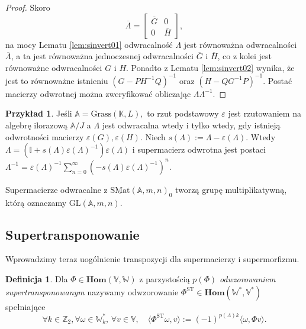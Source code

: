 \documentclass[11pt,a4paper]{report}
\theoremstyle{definition}
\newtheorem{example}[theorem]{Przykład}
\newtheorem{definition}[theorem]{Definicja}
\newcommand{\I}{\mathbb{I}}
\begin{document}
\begin{proof}
	Skoro $$\overline{\Lambda} = \begin{bmatrix}
	\overline{G} & 0 \\
	0 & \overline{H}
	\end{bmatrix},$$ na mocy Lematu \ref{lem:sinvert01} odwracalność $\Lambda$ jest równoważna odwracalności $\overline{\Lambda}$, a ta jest równoważna jednoczesnej odwracalności $\overline{G}$ i $\overline{H}$, co z kolei jest równoważne odwracalności $G$ i $H$. Ponadto z Lematu \ref{lem:sinvert02} wynika, że jest to równoważne istnieniu $(G-PH^{-1}Q)^{-1}$ oraz $(H-QG^{-1}P)^{-1}$. Postać macierzy odwrotnej można zweryfikować obliczając $\Lambda \Lambda^{-1}$.
\end{proof}

\begin{example}
	Jeśli $\mathbb{A} = \mathrm{Grass}(\mathbb{K}, L),$ to rzut podstawowy $\varepsilon$ jest rzutowaniem na algebrę ilorazową $\mathbb{A} / J$ a $\Lambda$ jest odwracalna wtedy i tylko wtedy, gdy istnieją odwrotności macierzy $\varepsilon(G), \varepsilon(H)$. Niech $s(\Lambda) := \Lambda - \varepsilon(\Lambda)$. Wtedy $\Lambda = (\I +s(\Lambda) \varepsilon(\Lambda)^{-1}) \varepsilon(\Lambda)$ i supermacierz odwrotna jest postaci $\Lambda^{-1} = \varepsilon(\Lambda)^{-1} \sum_{n=0}^{\infty} (-s(\Lambda) \varepsilon(\Lambda)^{-1})^{n}$.
\end{example}

Supermacierze odwracalne z $\underline{\mathrm{SMat}}(\mathbb{A},m,n)_0$ tworzą grupę multiplikatywną, którą oznaczamy $\mathrm{GL}(\mathbb{A},m,n).$

\subsection{Supertransponowanie}

Wprowadzimy teraz uogólnienie transpozycji dla supermacierzy i supermorfizmu.

\begin{definition}
	Dla $\Phi \in \mathbf{Hom}(\mathbb{V},\mathbb{W})$ z parzystością $p(\Phi)$ \textit{odwzorowaniem supertransponowanym} nazywamy odwzorowanie $\Phi^\mathrm{ST} \in \mathbf{Hom}(\mathbb{W}^*,\mathbb{V}^*)$ spełniające
	\begin{equation}
		\label{supertransposed_morphism}
		\forall k \in \mathbb{Z}_2, \forall \omega \in \mathbb{W}^*_k,\, \forall v \in \mathbb{V}, \quad \langle \Phi^{\mathrm{ST}} \omega , v \rangle := (-1)^{p(\Lambda)k} \langle \omega , \Phi v \rangle.
	\end{equation}
\end{definition}
\end{document}
